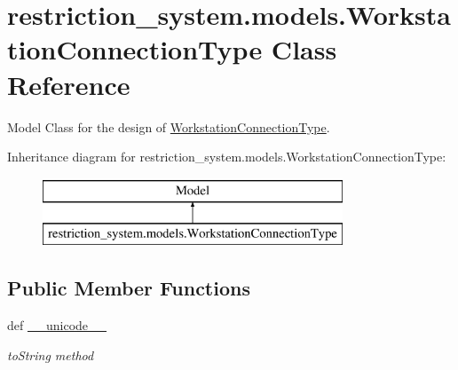 \hypertarget{classrestriction__system_1_1models_1_1WorkstationConnectionType}{}\section{restriction\+\_\+system.\+models.\+Workstation\+Connection\+Type Class Reference}
\label{classrestriction__system_1_1models_1_1WorkstationConnectionType}


Model Class for the design of \hyperlink{classrestriction__system_1_1models_1_1WorkstationConnectionType}{Workstation\+Connection\+Type}.  


Inheritance diagram for restriction\+\_\+system.\+models.\+Workstation\+Connection\+Type\+:\begin{figure}[H]
\begin{center}
\leavevmode
\includegraphics[height=2.000000cm]{classrestriction__system_1_1models_1_1WorkstationConnectionType}
\end{center}
\end{figure}
\subsection*{Public Member Functions}
\begin{DoxyCompactItemize}
\item 
def \hyperlink{classrestriction__system_1_1models_1_1WorkstationConnectionType_a7fc9bdcfd47bfde94586e345f65c5e18}{\+\_\+\+\_\+unicode\+\_\+\+\_\+}
\begin{DoxyCompactList}\small\item\em to\+String method \end{DoxyCompactList}\end{DoxyCompactItemize}
